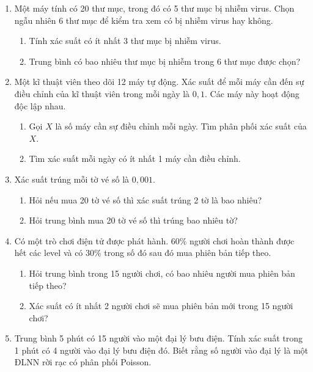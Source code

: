 \begin{enumerate}[label=\textbf{\arabic*.}]
    \item Một máy tính có 20 thư mục, trong đó có 5 thư mục bị nhiễm virus. Chọn ngẫu nhiên 6 thư mục để kiểm tra xem có bị nhiễm virus hay không.
    \begin{enumerate}[label=\alph*)]
        \item Tính xác suất có ít nhất 3 thư mục bị nhiễm virus.
        \item Trung bình có bao nhiêu thư mục bị nhiễm trong 6 thư mục được chọn?
    \end{enumerate}

    \item Một kĩ thuật viên theo dõi 12 máy tự động. Xác suất để mỗi máy cần đến sự điều chỉnh của kĩ thuật viên trong mỗi ngày là $0{,}1$. Các máy này hoạt động độc lập nhau.
    \begin{enumerate}[label=\alph*)]
        \item Gọi $X$ là số máy cần sự điều chỉnh mỗi ngày. Tìm phân phối xác suất của $X$.
        \item Tìm xác suất mỗi ngày có ít nhất 1 máy cần điều chỉnh.
    \end{enumerate}

    \item Xác suất trúng mỗi tờ vé số là $0{,}001$.
    \begin{enumerate}[label=\alph*)]
        \item Hỏi nếu mua 20 tờ vé số thì xác suất trúng 2 tờ là bao nhiêu?
        \item Hỏi trung bình mua 20 tờ vé số thì trúng bao nhiêu tờ?
    \end{enumerate}

    \item Có một trò chơi điện tử được phát hành. $60\%$ người chơi hoàn thành được hết các level và có $30\%$ trong số đó sau đó mua phiên bản tiếp theo.
    \begin{enumerate}[label=\alph*)]
        \item Hỏi trung bình trong 15 người chơi, có bao nhiêu người mua phiên bản tiếp theo?
        \item Xác suất có ít nhất 2 người chơi sẽ mua phiên bản mới trong 15 người chơi?
    \end{enumerate}

    \item Trung bình 5 phút có 15 người vào một đại lý bưu điện. Tính xác suất trong 1 phút có 4 người vào đại lý bưu điện đó. Biết rằng số người vào đại lý là một ĐLNN rời rạc có phân phối Poisson.


\end{enumerate}

